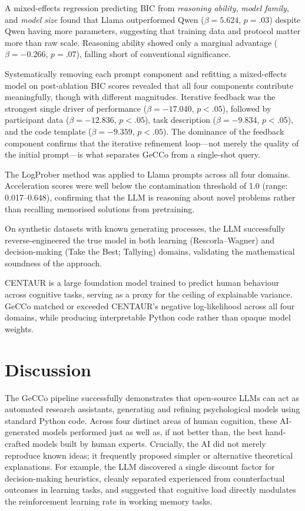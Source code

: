 A mixed-effects regression predicting BIC from \emph{reasoning ability}, \emph{model family}, and \emph{model size} found that Llama outperformed Qwen ($\beta = 5.624$, $p = .03$) despite Qwen having more parameters, suggesting that training data and protocol matter more than raw scale. Reasoning ability showed only a marginal advantage ($\beta = -0.266$, $p = .07$), falling short of conventional significance.

Systematically removing each prompt component and refitting a mixed-effects model on post-ablation BIC scores revealed that all four components contribute meaningfully, though with different magnitudes. Iterative feedback was the strongest single driver of performance ($\beta = -17.040$, $p < .05$), followed by participant data ($\beta = -12.836$, $p < .05$), task description ($\beta = -9.834$, $p < .05$), and the code template ($\beta = -9.359$, $p < .05$). The dominance of the feedback component confirms that the iterative refinement loop---not merely the quality of the initial prompt---is what separates GeCCo from a single-shot query.

The LogProber method was applied to Llama prompts across all four domains. Acceleration scores were well below the contamination threshold of 1.0 (range: 0.017--0.648), confirming that the LLM is reasoning about novel problems rather than recalling memorised solutions from pretraining.

On synthetic datasets with known generating processes, the LLM successfully reverse-engineered the true model in both learning (Rescorla--Wagner) and decision-making (Take the Best; Tallying) domains, validating the mathematical soundness of the approach.

CENTAUR is a large foundation model trained to predict human behaviour across cognitive tasks, serving as a proxy for the ceiling of explainable variance. GeCCo matched or exceeded CENTAUR's negative log-likelihood across all four domains, while producing interpretable Python code rather than opaque model weights.

\section{Discussion}
The GeCCo pipeline successfully demonstrates that open-source LLMs can act as automated research assistants, generating and refining psychological models using standard Python code. Across four distinct areas of human cognition, these AI-generated models performed just as well as, if not better than, the best hand-crafted models built by human experts. Crucially, the AI did not merely reproduce known ideas; it frequently proposed simpler or alternative theoretical explanations. For example, the LLM discovered a single discount factor for decision-making heuristics, cleanly separated experienced from counterfactual outcomes in learning tasks, and suggested that cognitive load directly modulates the reinforcement learning rate in working memory tasks. 

